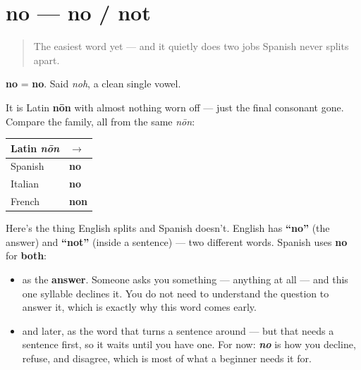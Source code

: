 \section[no]{no — no / not}

\label{lesson:ES-C19-no}



\begin{quote}
The easiest word yet — and it quietly does two jobs Spanish never splits apart.
\end{quote}

\begin{cousinweb}
\textbf{no} = \textbf{no}. Said \emph{noh}, a clean single vowel.

It is Latin \textbf{nōn} with almost nothing worn off — just the final consonant gone. Compare the family, all from the same \emph{nōn}:

\noindent
\begin{tabularx}{\linewidth}{@{}>{\raggedright\arraybackslash}X>{\raggedright\arraybackslash}X@{}}
\toprule
\textbf{Latin \emph{nōn}} & \textbf{$\to$} \\
\midrule
Spanish & \textbf{no} \\
Italian & \textbf{no} \\
French & \textbf{non} \\
\bottomrule
\end{tabularx}
\end{cousinweb}

\begin{culture}
Here's the thing English splits and Spanish doesn't. English has \textbf{\textquotedblleft{}no\textquotedblright{}} (the answer) and \textbf{\textquotedblleft{}not\textquotedblright{}} (inside a sentence) — two different words. Spanish uses \textbf{no} for \textbf{both}:

\begin{itemize}
\raggedright
  \item as the \textbf{answer}. Someone asks you something — anything at all — and this one syllable declines it. You do not need to understand the question to answer it, which is exactly why this word comes early.
  \item and later, as the word that turns a sentence around — but that needs a sentence first, so it waits until you have one. For now: \emph{\textbf{no}} is how you decline, refuse, and disagree, which is most of what a beginner needs it for.
\end{itemize}
\end{culture}

